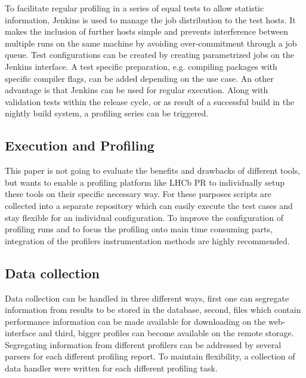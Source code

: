 \documentclass[a4paper]{jpconf}
\begin{document}
To facilitate regular profiling in a series of equal tests to allow statistic information, Jenkins is used to manage the job distribution to the test hosts. It makes the inclusion of further hosts simple and prevents interference between multiple runs on the same machine by avoiding over-commitment through a job queue. Test configurations can be created by creating parametrized  jobs on the Jenkins interface. A test specific preparation, e.g. compiling packages with specific compiler flags, can be added depending on the use case.
\newline
An other advantage is that Jenkins can be used for regular execution. Along with validation tests within the release cycle, or as result of a successful build in the nightly build system, a profiling series can be triggered.  

\subsection{Execution and Profiling}
\label{sec:execution_and_profiling}

This paper is not going to evaluate the benefits and drawbacks of different tools, but wants to enable a profiling platform like LHCb PR to individually setup these tools on their specific necessary way. For these purposes scripts are collected into a separate repository which can easily execute the test cases and stay flexible for an individual configuration. To improve the configuration of profiling runs and to focus the profiling onto main time consuming parts, integration of the profilers instrumentation methods are highly recommended.

\subsection{Data collection}
\label{sec:data_collection}

Data collection can be handled in three different ways, first one can segregate information from results to be stored in the database, second, files which contain performance information can be made available for downloading on the web-interface and third, bigger profiles can become available on the remote storage. Segregating information from different profilers can be addressed by several parsers for each different profiling report. To maintain flexibility, a collection of data handler were written for each different profiling task.
\end{document}
